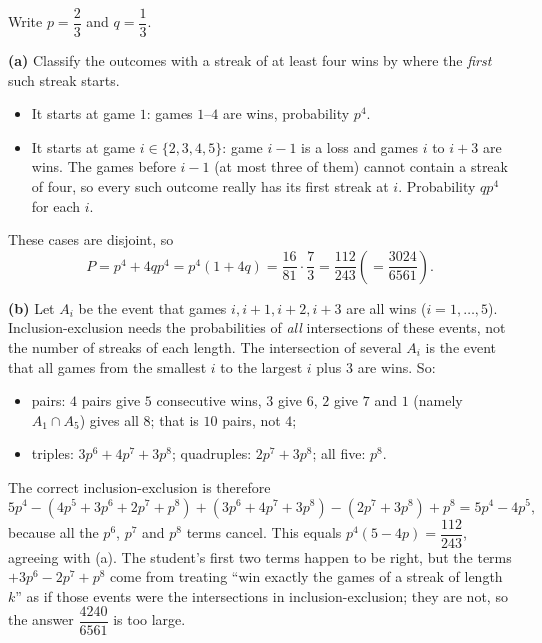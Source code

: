 Write $p=\dfrac{2}{3}$ and $q=\dfrac{1}{3}$.

\textbf{(a)} Classify the outcomes with a streak of at least four wins by where the \emph{first} such streak starts.
\begin{itemize}
\item It starts at game $1$: games $1$--$4$ are wins, probability $p^4$.
\item It starts at game $i\in\{2,3,4,5\}$: game $i-1$ is a loss and games $i$ to $i+3$ are wins. The games before $i-1$ (at most three of them) cannot contain a streak of four, so every such outcome really has its first streak at $i$. Probability $qp^4$ for each $i$.
\end{itemize}
These cases are disjoint, so
\[P=p^4+4qp^4=p^4(1+4q)=\dfrac{16}{81}\cdot\dfrac{7}{3}=\boxed{\dfrac{112}{243}}\left(=\dfrac{3024}{6561}\right).\]

\textbf{(b)} Let $A_i$ be the event that games $i,i+1,i+2,i+3$ are all wins ($i=1,\dots,5$). Inclusion-exclusion needs the probabilities of \emph{all} intersections of these events, not the number of streaks of each length. The intersection of several $A_i$ is the event that all games from the smallest $i$ to the largest $i$ plus $3$ are wins. So:
\begin{itemize}
\item pairs: $4$ pairs give $5$ consecutive wins, $3$ give $6$, $2$ give $7$ and $1$ (namely $A_1\cap A_5$) gives all $8$; that is $10$ pairs, not $4$;
\item triples: $3p^6+4p^7+3p^8$; quadruples: $2p^7+3p^8$; all five: $p^8$.
\end{itemize}
The correct inclusion-exclusion is therefore
\[5p^4-\left(4p^5+3p^6+2p^7+p^8\right)+\left(3p^6+4p^7+3p^8\right)-\left(2p^7+3p^8\right)+p^8=5p^4-4p^5,\]
because all the $p^6$, $p^7$ and $p^8$ terms cancel. This equals $p^4(5-4p)=\dfrac{112}{243}$, agreeing with (a). The student's first two terms happen to be right, but the terms $+3p^6-2p^7+p^8$ come from treating ``win exactly the games of a streak of length $k$'' as if those events were the intersections in inclusion-exclusion; they are not, so the answer $\dfrac{4240}{6561}$ is too large.
